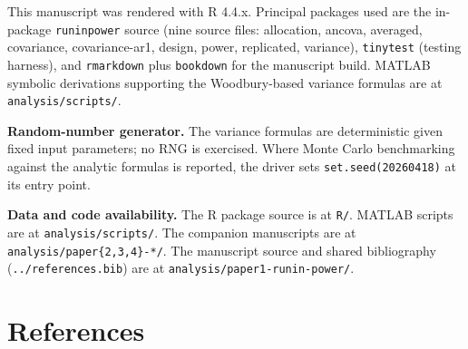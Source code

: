 \documentclass[
  11pt,
]{article}
\begin{document}
This manuscript was rendered with R 4.4.x. Principal packages used are
the in-package \texttt{runinpower} source (nine source files:
allocation, ancova, averaged, covariance, covariance-ar1, design, power,
replicated, variance), \texttt{tinytest} (testing harness), and
\texttt{rmarkdown} plus \texttt{bookdown} for the manuscript build.
MATLAB symbolic derivations supporting the Woodbury-based variance
formulas are at \texttt{analysis/scripts/}.

\textbf{Random-number generator.} The variance formulas are
deterministic given fixed input parameters; no RNG is exercised. Where
Monte Carlo benchmarking against the analytic formulas is reported, the
driver sets \texttt{set.seed(20260418)} at its entry point.

\textbf{Data and code availability.} The R package source is at
\texttt{R/}. MATLAB scripts are at \texttt{analysis/scripts/}. The
companion manuscripts are at \texttt{analysis/paper\{2,3,4\}-*/}. The
manuscript source and shared bibliography (\texttt{../references.bib})
are at \texttt{analysis/paper1-runin-power/}.

\section*{References}\label{references}
\end{document}
